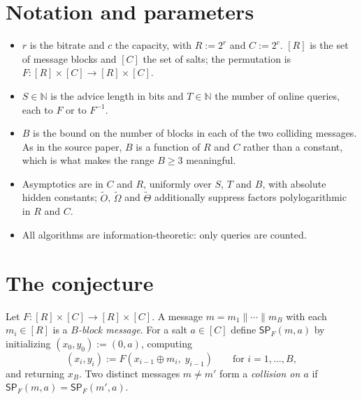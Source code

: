 \documentclass{conjura-conjecture}
\newcommand{\SP}{\mathsf{SP}}
\newcommand{\tO}{\tilde{O}}
\newcommand{\tOm}{\tilde{\Omega}}
\newcommand{\tTh}{\tilde{\Theta}}
\begin{document}
\section{Notation and parameters}\label{sec:notation}

\begin{itemize}
\item $r$ is the bitrate and $c$ the capacity, with $R := 2^{r}$ and
  $C := 2^{c}$. $[R]$ is the set of message blocks and $[C]$ the set of
  salts; the permutation is $F : [R] \times [C] \to [R] \times [C]$.
\item $S \in \mathbb{N}$ is the advice length in bits and
  $T \in \mathbb{N}$ the number of online queries, each to $F$ or to
  $F^{-1}$.
\item $B$ is the bound on the number of blocks in each of the two
  colliding messages. As in the source paper, $B$ is a function of $R$
  and $C$ rather than a constant, which is what makes the range
  $B \ge 3$ meaningful.
\item Asymptotics are in $C$ and $R$, uniformly over $S$, $T$ and $B$,
  with absolute hidden constants; $\tO$, $\tOm$ and $\tTh$ additionally
  suppress factors polylogarithmic in $R$ and $C$.
\item All algorithms are information-theoretic: only queries are
  counted.
\end{itemize}

\section{The conjecture}\label{sec:conjectures}

\begin{definition}\label{def:sponge}
Let $F : [R] \times [C] \to [R] \times [C]$. A message
$m = m_{1} \| \cdots \| m_{B}$ with each $m_{i} \in [R]$ is a
\emph{$B$-block message}. For a salt $a \in [C]$ define $\SP_{F}(m,a)$
by initializing $(x_{0}, y_{0}) := (0, a)$, computing
\[
  (x_{i}, y_{i}) := F(x_{i-1} \oplus m_{i},\; y_{i-1})
  \qquad \text{for } i = 1, \dots, B,
\]
and returning $x_{B}$. Two distinct messages $m \ne m'$ form a
\emph{collision on $a$} if $\SP_{F}(m,a) = \SP_{F}(m',a)$.
\end{definition}
\end{document}
